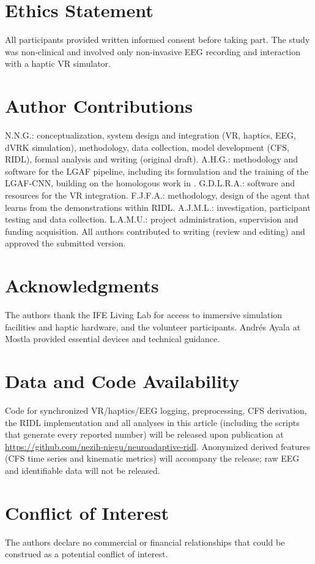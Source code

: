 \documentclass[utf8]{frontiers_suppmat}
\begin{document}
\section*{Ethics Statement}
All participants provided written informed consent before taking part. The study was non-clinical and involved only non-invasive EEG recording and interaction with a haptic VR simulator.

\section*{Author Contributions}
N.N.G.: conceptualization, system design and integration (VR, haptics, EEG, dVRK simulation), methodology, data collection, model development (CFS, RIDL), formal analysis and writing (original draft). A.H.G.: methodology and software for the LGAF pipeline, including its formulation and the training of the LGAF-CNN, building on the homologous work in \cite{HernandezGomez2025GAF}. G.D.L.R.A.: software and resources for the VR integration. F.J.F.A.: methodology, design of the agent that learns from the demonstrations within RIDL. A.J.M.L.: investigation, participant testing and data collection. L.A.M.U.: project administration, supervision and funding acquisition. All authors contributed to writing (review and editing) and approved the submitted version.

\section*{Acknowledgments}
The authors thank the IFE Living Lab for access to immersive simulation facilities and haptic hardware, and the volunteer participants. Andr\'es Ayala at Mostla provided essential devices and technical guidance.

\section*{Data and Code Availability}
Code for synchronized VR/haptics/EEG logging, preprocessing, CFS derivation, the RIDL implementation and all analyses in this article (including the scripts that generate every reported number) will be released upon publication at \url{https://github.com/nezih-niegu/neuroadaptive-ridl}. Anonymized derived features (CFS time series and kinematic metrics) will accompany the release; raw EEG and identifiable data will not be released.

\section*{Conflict of Interest}
The authors declare no commercial or financial relationships that could be construed as a potential conflict of interest.

\clearpage



\end{document}
